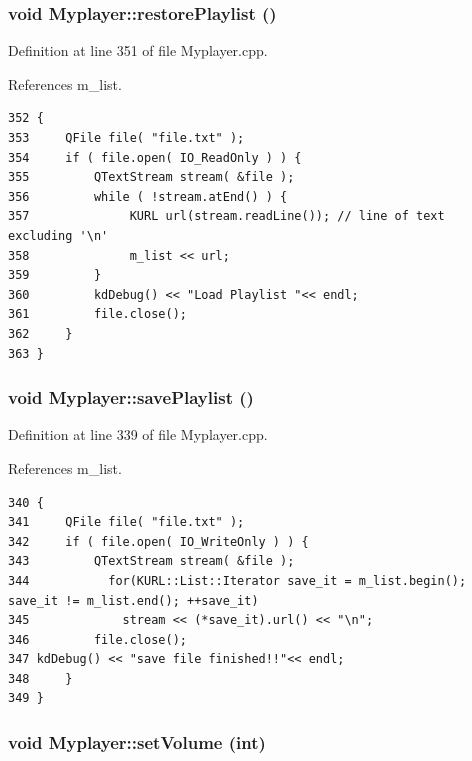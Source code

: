 \subsubsection{\setlength{\rightskip}{0pt plus 5cm}void Myplayer::restore\-Playlist ()\hspace{0.3cm}{\tt  [private]}}\label{classMyplayer_Myplayerd1}




Definition at line 351 of file Myplayer.cpp.

References m\_\-list.



\footnotesize\begin{verbatim}352 {
353     QFile file( "file.txt" );
354     if ( file.open( IO_ReadOnly ) ) {
355         QTextStream stream( &file );            
356         while ( !stream.atEnd() ) {
357              KURL url(stream.readLine()); // line of text excluding '\n'         
358              m_list << url;
359         }
360         kdDebug() << "Load Playlist "<< endl;
361         file.close();
362     }
363 }
\end{verbatim}\normalsize 
{}
\subsubsection{\setlength{\rightskip}{0pt plus 5cm}void Myplayer::save\-Playlist ()\hspace{0.3cm}{\tt  [private]}}\label{classMyplayer_Myplayerd0}




Definition at line 339 of file Myplayer.cpp.

References m\_\-list.



\footnotesize\begin{verbatim}340 {
341     QFile file( "file.txt" );
342     if ( file.open( IO_WriteOnly ) ) {
343         QTextStream stream( &file );
344           for(KURL::List::Iterator save_it = m_list.begin(); save_it != m_list.end(); ++save_it)
345             stream << (*save_it).url() << "\n";
346         file.close();
347 kdDebug() << "save file finished!!"<< endl;     
348     }    
349 }
\end{verbatim}\normalsize 
{}
\subsubsection{\setlength{\rightskip}{0pt plus 5cm}void Myplayer::set\-Volume (int)\hspace{0.3cm}{\tt  [slot]}}\label{classMyplayer_Myplayeri8}




